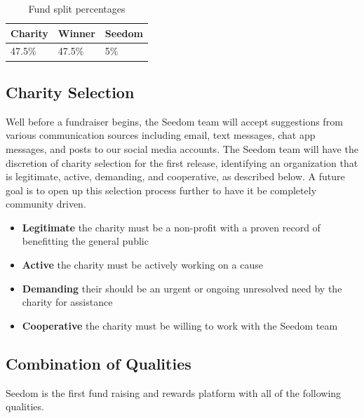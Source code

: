 \documentclass[11pt]{article}
\begin{document}
\begin{table}[H]
\begin{center}
\begin{tabular}{| l | l | l |}
\hline
\textbf{Charity} & \textbf{Winner} & \textbf{Seedom} \\ \hline
47.5\% & 47.5\%  & 5\% \\ \hline
\end{tabular}
\caption{Fund split percentages}
\label{tab:fundSplitPercentages}
\end{center}
\end{table}

\subsection{Charity Selection}

Well before a fundraiser begins, the Seedom team will accept suggestions from various communication sources including email, text messages, chat app messages, and posts to our social media accounts. The Seedom team will have the discretion of charity selection for the first release, identifying an organization that is legitimate, active, demanding, and cooperative, as described below. A future goal is to open up this selection process further to have it be completely community driven.

\begin{itemize}
\item{\textbf{Legitimate} the charity must be a non-profit with a proven record of benefitting the general public}
\item{\textbf{Active} the charity must be actively working on a cause}
\item{\textbf{Demanding} their should be an urgent or ongoing unresolved need by the charity for assistance}
\item{\textbf{Cooperative} the charity must be willing to work with the Seedom team}
\end{itemize}

\subsection{Combination of Qualities}

Seedom is the first fund raising and rewards platform with all of the following qualities.
\end{document}
